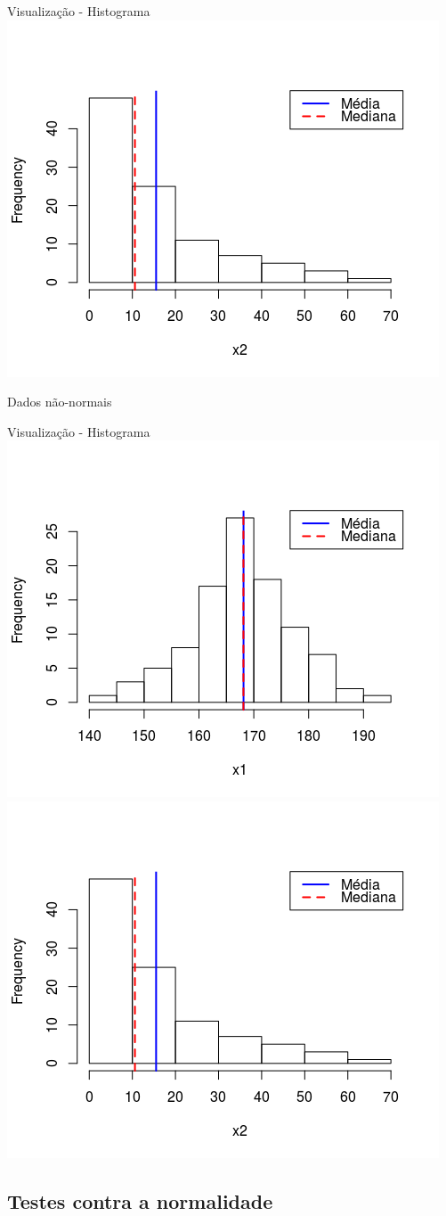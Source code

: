 \documentclass{beamer}
\begin{document}
\begin{frame}{Visualização - Histograma}
  \centering
  \includegraphics[width=.7\textwidth]{Nao_Param/lognormal2-h}

  Dados não-normais
\end{frame}

\begin{frame}{Visualização - Histograma}
  \centering
  \includegraphics[width=.5\textwidth]{Nao_Param/normal2-h}
  \includegraphics[width=.5\textwidth]{Nao_Param/lognormal2-h}
\end{frame}

\subsection[Normalidade]{Testes contra a normalidade}
\end{document}
